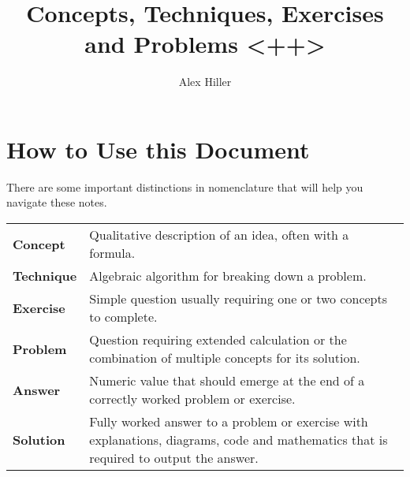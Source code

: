 \documentclass{article}
\author{Alex Hiller}
\title{Concepts, Techniques, Exercises and Problems <++>}
\newcounter{concepts}
\newcommand{\btab}[1]{\begin{table}[!h] \begin{center} \begin{tabular}{#1}}
\newcommand{\etab}{ \end{tabular} \end{center} \end{table}}
\newcommand{\s}[1]{\section{#1}}
\begin{document}
\maketitle
\clearpage
\tableofcontents
\clearpage

\s{How to Use this Document}
There are some important distinctions in nomenclature that will help you navigate these notes.

\btab{p{}p{}}
 \textbf{Concept}   & Qualitative description of an idea, often with a formula. \vspace{3mm} \\
 \textbf{Technique} & Algebraic algorithm for breaking down a problem. \vspace{3mm} \\ 
 \textbf{Exercise}  & Simple question usually requiring one or two concepts
   to complete. \vspace{3mm} \\  
 \textbf{Problem}   & Question requiring extended calculation or the combination of 
   multiple concepts for its solution.\vspace{3mm} \\ 
 \textbf{Answer}    & Numeric value that should emerge at the end of a 
   correctly worked problem or exercise.\vspace{3mm}  \\
 \textbf{Solution}  & Fully worked answer to a problem or exercise with explanations, 
  diagrams, code and mathematics that is required to output the answer. \vspace{3mm} \\ 
\etab


\clearpage
\end{document}
